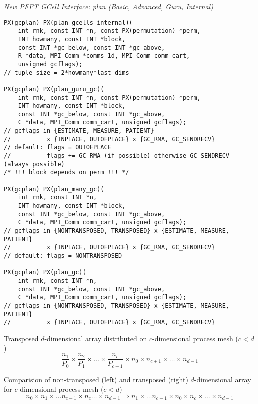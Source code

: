 \emph{New PFFT GCell Interface: plan (Basic, Advanced, Guru, Internal)}
\begin{lstlisting}
PX(gcplan) PX(plan_gcells_internal)(
    int rnk, const INT *n, const PX(permutation) *perm,
    INT howmany, const INT *block,
    const INT *gc_below, const INT *gc_above,
    R *data, MPI_Comm *comms_1d, MPI_Comm comm_cart,
    unsigned gcflags);
// tuple_size = 2*howmany*last_dims

PX(gcplan) PX(plan_guru_gc)(
    int rnk, const INT *n, const PX(permutation) *perm,
    INT howmany, const INT *block,
    const INT *gc_below, const INT *gc_above,
    C *data, MPI_Comm comm_cart, unsigned gcflags);
// gcflags in {ESTIMATE, MEASURE, PATIENT}
//          x {INPLACE, OUTOFPLACE} x {GC_RMA, GC_SENDRECV}
// default: flags = OUTOFPLACE
//          flags += GC_RMA (if possible) otherwise GC_SENDRECV (always possible)
/* !!! block depends on perm !!! */

PX(gcplan) PX(plan_many_gc)(
    int rnk, const INT *n,
    INT howmany, const INT *block,
    const INT *gc_below, const INT *gc_above,
    C *data, MPI_Comm comm_cart, unsigned gcflags);
// gcflags in {NONTRANSPOSED, TRANSPOSED} x {ESTIMATE, MEASURE, PATIENT}
//          x {INPLACE, OUTOFPLACE} x {GC_RMA, GC_SENDRECV}
// default: flags = NONTRANSPOSED

PX(gcplan) PX(plan_gc)(
    int rnk, const INT *n,
    const INT *gc_below, const INT *gc_above,
    C *data, MPI_Comm comm_cart, unsigned gcflags);
// gcflags in {NONTRANSPOSED, TRANSPOSED} x {ESTIMATE, MEASURE, PATIENT}
//          x {INPLACE, OUTOFPLACE} x {GC_RMA, GC_SENDRECV}
\end{lstlisting}


\newpage
Transposed $d$-dimensional array distributed on $c$-dimensional process mesh ($c<d$)
\begin{equation*}
  \frac{n_1}{P_0} \times \frac{n_2}{P_1} \times \hdots \times \frac{n_c}{P_{c-1}}  \times n_0 \times n_{c+1} \times \hdots \times n_{d-1}
\end{equation*}

Comparision of non-transposed (left) and transposed (right) $d$-dimensional array for $c$-dimensional process mesh ($c<d$)
\begin{equation*}
  n_0\times n_1\times \hdots n_{c-1} \times n_c \hdots \times n_{d-1} \Rightarrow n_1 \times \hdots n_{c-1} \times n_0 \times n_c \times \hdots \times n_{d-1}
\end{equation*}








